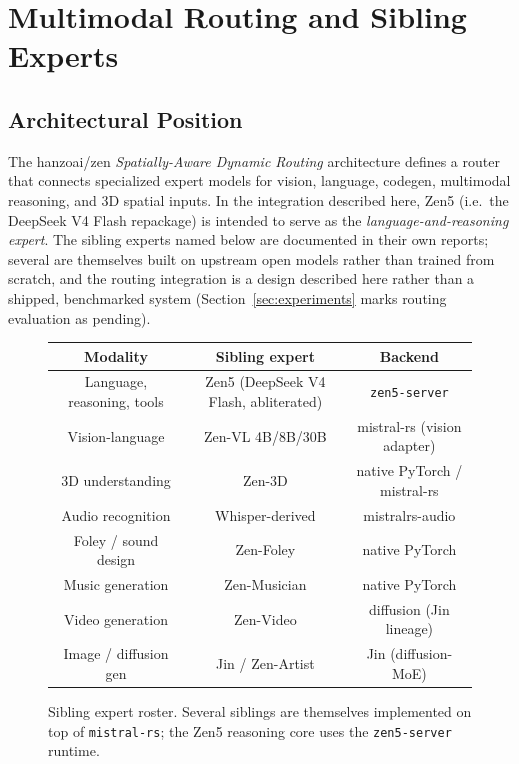 \documentclass[11pt,a4paper]{article}
\begin{document}
\section{Multimodal Routing and Sibling Experts}
\label{sec:routing}

\subsection{Architectural Position}

The hanzoai/zen \emph{Spatially-Aware Dynamic Routing} architecture \cite{hanzoai-zen} defines a router
that connects specialized expert models for vision, language, codegen, multimodal reasoning, and 3D
spatial inputs. In the integration described here, Zen5 (i.e.\ the DeepSeek V4 Flash repackage) is
intended to serve as the \emph{language-and-reasoning expert}. The sibling experts named below are
documented in their own reports; several are themselves built on upstream open models rather than
trained from scratch, and the routing integration is a design described here rather than a shipped,
benchmarked system (Section~\ref{sec:experiments} marks routing evaluation as pending).

\begin{figure}[H]
\centering
\begin{tabular}{|c|c|c|}
\hline
\textbf{Modality} & \textbf{Sibling expert} & \textbf{Backend} \\
\hline
Language, reasoning, tools & Zen5 (DeepSeek V4 Flash, abliterated) & \texttt{zen5-server} \\
Vision-language & Zen-VL 4B/8B/30B & mistral-rs (vision adapter) \\
3D understanding & Zen-3D & native PyTorch / mistral-rs \\
Audio recognition & Whisper-derived & mistralrs-audio \\
Foley / sound design & Zen-Foley & native PyTorch \\
Music generation & Zen-Musician & native PyTorch \\
Video generation & Zen-Video & diffusion (Jin lineage) \\
Image / diffusion gen & Jin / Zen-Artist & Jin (diffusion-MoE) \\
\hline
\end{tabular}
\caption{Sibling expert roster. Several siblings are themselves implemented on top of \texttt{mistral-rs};
the Zen5 reasoning core uses the \texttt{zen5-server} runtime.}
\end{figure}
\end{document}
